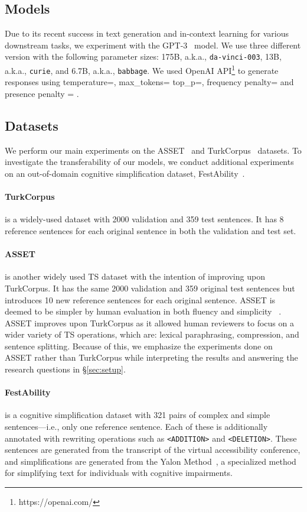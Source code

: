 \documentclass[11pt]{article}
\begin{document}
\subsection{Models}
Due to its recent success in text generation and in-context learning for various downstream tasks, we experiment with the GPT-3~\citep{gpt3} model. We use three different version with the following parameter sizes: 175B, a.k.a., \texttt{da-vinci-003}, 13B, a.k.a., \texttt{curie}, and 6.7B, a.k.a., \texttt{babbage}. We used OpenAI API\footnote{https://openai.com/} to generate responses using temperature=, max\_tokens= top\_p=, frequency penalty= and presence penalty = .

\subsection{Datasets}
    We perform our main experiments on the ASSET~\cite{alva-manchego-etal-2020-asset} and TurkCorpus~\cite{xu-etal-2016-optimizing} datasets. To investigate the transferability of our models, we conduct additional experiments on an out-of-domain cognitive simplification dataset, FestAbility~\cite{chamovitz2022cognitive}.
    
    \paragraph{TurkCorpus} is a widely-used dataset with 2000 validation and 359 test sentences. It has 8 reference sentences for each original sentence in both the validation and test set. 
     
    \paragraph{ASSET} is another widely used TS dataset with the intention of improving upon TurkCorpus. It has the same 2000 validation and 359 original test sentences but introduces 10 new reference sentences for each original sentence. ASSET is deemed to be simpler by human evaluation in both fluency and simplicity ~\citep{alva-manchego-etal-2020-asset}. ASSET improves upon TurkCorpus as it allowed human reviewers to focus on a wider variety of TS operations, which are: lexical paraphrasing, compression, and sentence splitting. Because of this, we emphasize the experiments done on ASSET rather than TurkCorpus while interpreting the results and answering the research questions in \S \ref{sec:setup}. 
    
    \paragraph{FestAbility} is a cognitive simplification dataset with 321 pairs of complex and simple sentences---i.e., only one reference sentence. Each of these is additionally annotated with rewriting operations such as \texttt{<ADDITION>} and \texttt{<DELETION>}. These sentences are generated from the transcript of the virtual accessibility conference, and simplifications are generated from the Yalon Method~\citep{chamovitz2022cognitive}, a specialized method for simplifying text for individuals with cognitive impairments.
\end{document}
